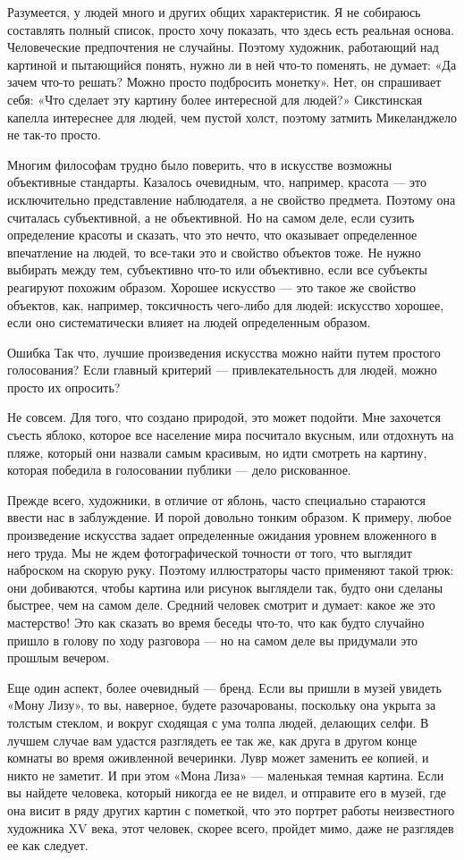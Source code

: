\documentclass[ebook,12pt,oneside,openany]{memoir}
\begin{document}
Разумеется, у людей много и других общих характеристик. Я не собираюсь
составлять полный список, просто хочу показать, что здесь есть
реальная основа. Человеческие предпочтения не случайны. Поэтому
художник, работающий над картиной и пытающийся понять, нужно ли в ней
что-то поменять, не думает: «Да зачем что-то решать? Можно просто
подбросить монетку». Нет, он спрашивает себя: «Что сделает эту картину
более интересной для людей?» Сикстинская капелла интереснее для людей,
чем пустой холст, поэтому затмить Микеланджело не так-то просто.

Многим философам трудно было поверить, что в искусстве возможны
объективные стандарты. Казалось очевидным, что, например, красота —
это исключительно представление наблюдателя, а не свойство предмета.
Поэтому она считалась субъективной, а не объективной. Но на самом
деле, если сузить определение красоты и сказать, что это нечто, что
оказывает определенное впечатление на людей, то все-таки это и
свойство объектов тоже. Не нужно выбирать между тем, субъективно
что-то или объективно, если все субъекты реагируют похожим образом.
Хорошее искусство — это такое же свойство объектов, как, например,
токсичность чего-либо для людей: искусство хорошее, если оно
систематически влияет на людей определенным образом.

Ошибка Так что, лучшие произведения искусства можно найти путем
простого голосования? Если главный критерий — привлекательность для
людей, можно просто их опросить?

Не совсем. Для того, что создано природой, это может подойти. Мне
захочется съесть яблоко, которое все население мира посчитало вкусным,
или отдохнуть на пляже, который они назвали самым красивым, но идти
смотреть на картину, которая победила в голосовании публики — дело
рискованное.

Прежде всего, художники, в отличие от яблонь, часто специально
стараются ввести нас в заблуждение. И порой довольно тонким образом. К
примеру, любое произведение искусства задает определенные ожидания
уровнем вложенного в него труда. Мы не ждем фотографической точности
от того, что выглядит наброском на скорую руку. Поэтому иллюстраторы
часто применяют такой трюк: они добиваются, чтобы картина или рисунок
выглядели так, будто они сделаны быстрее, чем на самом деле. Средний
человек смотрит и думает: какое же это мастерство! Это как сказать во
время беседы что-то, что как будто случайно пришло в голову по ходу
разговора — но на самом деле вы придумали это прошлым вечером.

Еще один аспект, более очевидный — бренд. Если вы пришли в музей
увидеть «Мону Лизу», то вы, наверное, будете разочарованы, поскольку
она укрыта за толстым стеклом, и вокруг сходящая с ума толпа людей,
делающих селфи. В лучшем случае вам удастся разглядеть ее так же, как
друга в другом конце комнаты во время оживленной вечеринки. Лувр может
заменить ее копией, и никто не заметит. И при этом «Мона Лиза» —
маленькая темная картина. Если вы найдете человека, который никогда ее
не видел, и отправите его в музей, где она висит в ряду других картин
с пометкой, что это портрет работы неизвестного художника XV века,
этот человек, скорее всего, пройдет мимо, даже не разглядев ее как
следует.
\end{document}
